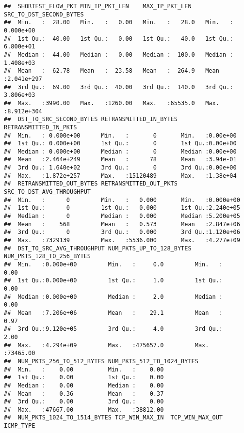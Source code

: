 \documentclass[
]{article}
\begin{document}
\begin{verbatim}
##  SHORTEST_FLOW_PKT MIN_IP_PKT_LEN    MAX_IP_PKT_LEN    SRC_TO_DST_SECOND_BYTES
##  Min.   :  28.00   Min.   :   0.00   Min.   :   28.0   Min.   : 0.000e+00     
##  1st Qu.:  40.00   1st Qu.:   0.00   1st Qu.:   40.0   1st Qu.: 6.800e+01     
##  Median :  44.00   Median :   0.00   Median :  100.0   Median : 1.408e+03     
##  Mean   :  62.78   Mean   :  23.58   Mean   :  264.9   Mean   :2.041e+297     
##  3rd Qu.:  69.00   3rd Qu.:  40.00   3rd Qu.:  140.0   3rd Qu.: 3.806e+03     
##  Max.   :3990.00   Max.   :1260.00   Max.   :65535.0   Max.   :8.912e+304     
##  DST_TO_SRC_SECOND_BYTES RETRANSMITTED_IN_BYTES RETRANSMITTED_IN_PKTS
##  Min.   : 0.000e+00      Min.   :       0       Min.   :0.00e+00     
##  1st Qu.: 0.000e+00      1st Qu.:       0       1st Qu.:0.00e+00     
##  Median : 0.000e+00      Median :       0       Median :0.00e+00     
##  Mean   :2.464e+249      Mean   :      78       Mean   :3.94e-01     
##  3rd Qu.: 1.640e+02      3rd Qu.:       0       3rd Qu.:0.00e+00     
##  Max.   :1.872e+257      Max.   :15120489       Max.   :1.38e+04     
##  RETRANSMITTED_OUT_BYTES RETRANSMITTED_OUT_PKTS SRC_TO_DST_AVG_THROUGHPUT
##  Min.   :      0         Min.   :   0.000       Min.   :0.000e+00        
##  1st Qu.:      0         1st Qu.:   0.000       1st Qu.:2.240e+05        
##  Median :      0         Median :   0.000       Median :5.200e+05        
##  Mean   :    568         Mean   :   0.573       Mean   :2.847e+06        
##  3rd Qu.:      0         3rd Qu.:   0.000       3rd Qu.:1.120e+06        
##  Max.   :7329139         Max.   :5536.000       Max.   :4.277e+09        
##  DST_TO_SRC_AVG_THROUGHPUT NUM_PKTS_UP_TO_128_BYTES NUM_PKTS_128_TO_256_BYTES
##  Min.   :0.000e+00         Min.   :     0.0         Min.   :    0.00         
##  1st Qu.:0.000e+00         1st Qu.:     1.0         1st Qu.:    0.00         
##  Median :0.000e+00         Median :     2.0         Median :    0.00         
##  Mean   :7.206e+06         Mean   :    29.1         Mean   :    0.97         
##  3rd Qu.:9.120e+05         3rd Qu.:     4.0         3rd Qu.:    2.00         
##  Max.   :4.294e+09         Max.   :475657.0         Max.   :73465.00         
##  NUM_PKTS_256_TO_512_BYTES NUM_PKTS_512_TO_1024_BYTES
##  Min.   :    0.00          Min.   :    0.00          
##  1st Qu.:    0.00          1st Qu.:    0.00          
##  Median :    0.00          Median :    0.00          
##  Mean   :    0.36          Mean   :    0.37          
##  3rd Qu.:    0.00          3rd Qu.:    0.00          
##  Max.   :47667.00          Max.   :38812.00          
##  NUM_PKTS_1024_TO_1514_BYTES TCP_WIN_MAX_IN  TCP_WIN_MAX_OUT   ICMP_TYPE    

\end{verbatim}
\end{document}
